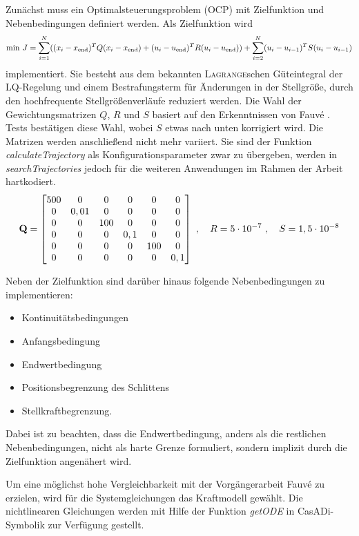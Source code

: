 Zunächst muss ein Optimalsteuerungsproblem (OCP) mit Zielfunktion und Nebenbedingungen definiert werden. Als Zielfunktion wird 
	\[
	\mathrm{min} \ J = \sum_{i=1}^N ((x_i-x_{\mathrm{end}})^T Q (x_i-x_{\mathrm{end}}) + (u_i-u_{\mathrm{end}})^T R (u_i-u_{\mathrm{end}})) + 
	\sum_{i=2}^N (u_i-u_{i-1})^T S (u_i-u_{i-1})
\]
implementiert. Sie besteht aus dem bekannten \textsc{Lagrange}schen Güteintegral der LQ-Regelung und einem Bestrafungsterm für Änderungen in der Stellgröße, durch den hochfrequente Stellgrößenverläufe reduziert werden. Die Wahl der Gewichtungsmatrizen $Q$, $R$ und $S$ basiert auf den Erkenntnissen von Fauvé \cite{fauve}. Tests bestätigen diese Wahl, wobei $S$ etwas nach unten korrigiert wird. Die Matrizen werden anschließend nicht mehr variiert. Sie sind der Funktion \textit{calculateTrajectory} als Konfigurationsparameter zwar zu übergeben, werden in \textit{searchTrajectories} jedoch für die weiteren Anwendungen im Rahmen der Arbeit hartkodiert.
\[ 
	{\boldsymbol{\mathrm{Q}}} = 
	\begin{bmatrix}
		500 & 0 & 0 & 0 & 0 & 0 \\
		0 & 0,01 & 0 & 0 & 0 & 0 \\
		0 & 0 & 100 & 0 & 0 & 0 \\
		0 & 0 & 0 & 0,1 & 0 & 0 \\
		0 & 0 & 0 & 0 & 100 & 0 \\
		0 & 0 & 0 & 0 & 0 & 0,1 \\
	\end{bmatrix} \ , \quad
	R = 5 \cdot 10^{-7} \ , \quad
	S = 1,5 \cdot 10^{-8} \\	
\]


Neben der Zielfunktion sind darüber hinaus folgende Nebenbedingungen zu implementieren:
\begin{itemize}
	\item Kontinuitätsbedingungen 
	\item Anfangsbedingung
	\item Endwertbedingung
	\item Positionsbegrenzung des Schlittens
	\item Stellkraftbegrenzung.
\end{itemize}

Dabei ist zu beachten, dass die Endwertbedingung, anders als die restlichen Nebenbedingungen, nicht als harte Grenze formuliert, sondern implizit durch die Zielfunktion angenähert wird. 

Um eine möglichst hohe Vergleichbarkeit mit der Vorgängerarbeit Fauvé \cite{fauve} zu erzielen, wird für die Systemgleichungen das Kraftmodell gewählt. Die nichtlinearen Gleichungen werden mit Hilfe der Funktion \textit{getODE} in CasADi-Symbolik zur Verfügung gestellt.

